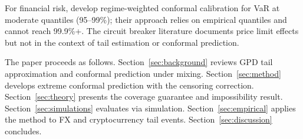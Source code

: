 For financial risk, \citet{schmitt2026taming} develop regime-weighted conformal calibration for VaR at moderate quantiles (95--99\%); their approach relies on empirical quantiles and cannot reach 99.9\%+. The circuit breaker literature \citep{subrahmanyam1994circuit,kim2008price} documents price limit effects but not in the context of tail estimation or conformal prediction.

The paper proceeds as follows. Section~\ref{sec:background} reviews GPD tail approximation and conformal prediction under mixing. Section~\ref{sec:method} develops extreme conformal prediction with the censoring correction. Section~\ref{sec:theory} presents the coverage guarantee and impossibility result. Section~\ref{sec:simulations} evaluates via simulation. Section~\ref{sec:empirical} applies the method to FX and cryptocurrency tail events. Section~\ref{sec:discussion} concludes.
